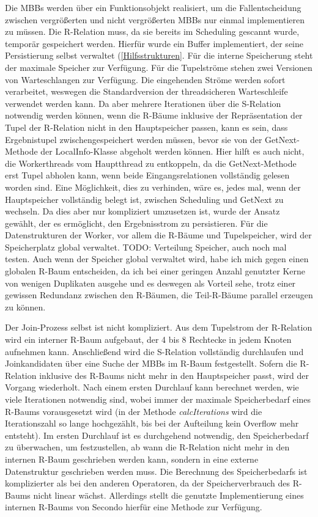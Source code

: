 \documentclass[a4paper,12pt,twoside]{article}
\newcommand{\Fb}[1]{\textit{#1}} %
\begin{document}
Die MBBs werden über ein Funktionsobjekt realisiert, um die Fallentscheidung zwischen vergrößerten und nicht vergrößerten MBBs nur einmal implementieren zu müssen. Die R-Relation muss, da sie bereits im Scheduling gescannt wurde, temporär gespeichert werden. Hierfür wurde ein Buffer implementiert, der seine Persistierung selbst verwaltet (\autoref{Hilfsstrukturen}. Für die interne Speicherung steht der maximale Speicher zur Verfügung. Für die Tupelströme stehen zwei Versionen von Warteschlangen zur Verfügung. Die eingehenden Ströme werden sofort verarbeitet, weswegen die Standardversion der threadsicheren Warteschleife verwendet werden kann. Da aber mehrere Iterationen über die S-Relation notwendig werden können, wenn die R-Bäume inklusive der Repräsentation der Tupel der R-Relation nicht in den Hauptspeicher passen, kann es sein, dass Ergebnistupel zwischengespeichert werden müssen, bevor sie von der GetNext-Methode der LocalInfo-Klasse abgeholt werden können. Hier hilft es auch nicht, die Workerthreads vom Hauptthread zu entkoppeln, da die GetNext-Methode erst Tupel abholen kann, wenn beide Eingangsrelationen vollständig gelesen worden sind. Eine Möglichkeit, dies zu verhinden, wäre es, jedes mal, wenn der Hauptspeicher vollständig belegt ist, zwischen Scheduling und GetNext zu wechseln. Da dies aber nur kompliziert umzusetzen ist, wurde der Ansatz gewählt, der es ermöglicht, den Ergebnisstrom zu persistieren. Für die Datenstrukturen der Worker, vor allem die R-Bäume und Tupelspeicher, wird der Speicherplatz global verwaltet. TODO: Verteilung Speicher, auch noch mal testen. Auch wenn der Speicher global verwaltet wird, habe ich mich gegen einen globalen R-Baum entscheiden, da ich bei einer geringen Anzahl genutzter Kerne von wenigen Duplikaten ausgehe und es deswegen als Vorteil sehe, trotz einer gewissen Redundanz zwischen den R-Bäumen, die Teil-R-Bäume parallel erzeugen zu können.

Der Join-Prozess selbst ist nicht kompliziert. Aus dem Tupelstrom der R-Relation wird ein interner R-Baum aufgebaut, der 4 bis 8 Rechtecke in jedem Knoten aufnehmen kann. Anschließend wird die S-Relation vollständig durchlaufen und Joinkandidaten über eine Suche der MBBs im R-Baum festgestellt. Sofern die R-Relation inklusive des R-Baums nicht mehr in den Hauptspeicher passt, wird der Vorgang wiederholt. Nach einem ersten Durchlauf kann berechnet werden, wie viele Iterationen notwendig sind, wobei immer der maximale Speicherbedarf eines R-Baums vorausgesetzt wird (in der Methode \Fb{calcIterations} wird die Iterationszahl so lange hochgezählt, bis bei der Aufteilung kein Overflow mehr entsteht). Im ersten Durchlauf ist es durchgehend notwendig, den Speicherbedarf zu überwachen, um festzustellen, ab wann die R-Relation nicht mehr in den internen R-Baum geschrieben werden kann, sondern in eine externe Datenstruktur geschrieben werden muss. Die Berechnung des Speicherbedarfs ist komplizierter als bei den anderen Operatoren, da der Speicherverbrauch des R-Baums nicht linear wächst. Allerdings stellt die genutzte Implementierung eines internen R-Baums von Secondo hierfür eine Methode zur Verfügung.
\end{document}

